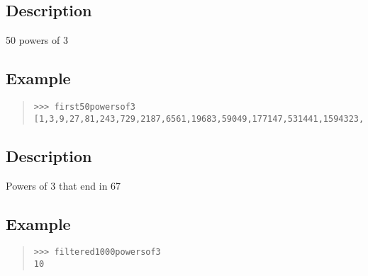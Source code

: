 \begin{haddockdesc}
\item[\begin{tabular}{@{}l}
first50powersof3 :: {\char 91}Integer{\char 93}
\end{tabular}]
{\haddockbegindoc
\section*{Description}
50 powers of 3\par
\subsection*{Example}
\begin{quote}
{\haddockverb\begin{verbatim}
>>> first50powersof3
[1,3,9,27,81,243,729,2187,6561,19683,59049,177147,531441,1594323,4782969,14348907,43046721,129140163,387420489,1162261467,3486784401,10460353203,31381059609,94143178827,282429536481,847288609443,2541865828329,7625597484987,22876792454961,68630377364883,205891132094649,617673396283947,1853020188851841,5559060566555523,16677181699666569,50031545098999707,150094635296999121,450283905890997363,1350851717672992089,4052555153018976267,12157665459056928801,36472996377170786403,109418989131512359209,328256967394537077627,984770902183611232881,2954312706550833698643,8862938119652501095929,26588814358957503287787,79766443076872509863361,239299329230617529590083]

\end{verbatim}}
\end{quote}}
\end{haddockdesc}
\begin{haddockdesc}
\item[\begin{tabular}{@{}l}
filtered1000powersof3 :: Int
\end{tabular}]
{\haddockbegindoc
\section*{Description}
Powers of 3 that end in 67\par
\subsection*{Example}
\begin{quote}
{\haddockverb\begin{verbatim}
>>> filtered1000powersof3
10

\end{verbatim}}
\end{quote}}
\end{haddockdesc}
